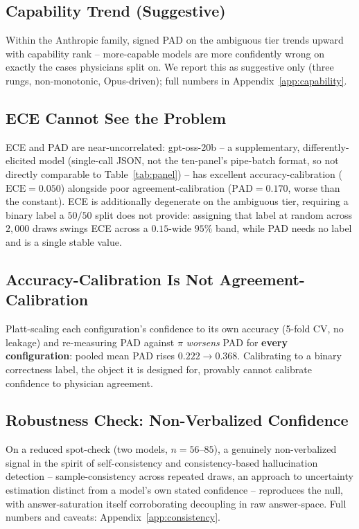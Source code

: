 \documentclass[letterpaper]{article} %
\begin{document}
\subsection{Capability Trend (Suggestive)}
\label{sec:capability}
Within the Anthropic family, signed PAD on the ambiguous tier trends upward
with capability rank -- more-capable models are more confidently wrong on
exactly the cases physicians split on. We report this as suggestive only
(three rungs, non-monotonic, Opus-driven); full numbers in
Appendix~\ref{app:capability}.

\subsection{ECE Cannot See the Problem}
ECE and PAD are near-uncorrelated: gpt-oss-20b -- a supplementary,
differently-elicited model (single-call JSON, not the ten-panel's
pipe-batch format, so not directly comparable to Table~\ref{tab:panel}) --
has excellent accuracy-calibration ($\mathrm{ECE}{=}0.050$) alongside poor
agreement-calibration ($\mathrm{PAD}{=}0.170$, worse than the constant). ECE
is additionally degenerate on the ambiguous tier, requiring a binary label a
$50/50$ split does not provide: assigning that label at random across
$2{,}000$ draws swings ECE across a $0.15$-wide $95\%$ band, while PAD needs
no label and is a single stable value.

\subsection{Accuracy-Calibration Is Not Agreement-Calibration}
\label{sec:acc-cal}
Platt-scaling each configuration's confidence to its own accuracy (5-fold
CV, no leakage) and re-measuring PAD against $\pi$ \emph{worsens} PAD for
\textbf{every configuration}: pooled mean PAD rises $0.222\to0.368$.
Calibrating to a binary correctness label, the object it is designed for,
provably cannot calibrate confidence to physician agreement.

\subsection{Robustness Check: Non-Verbalized Confidence}
\label{sec:consistency}
On a reduced spot-check (two models, $n{=}56$--$85$), a genuinely
non-verbalized signal in the spirit of self-consistency and
consistency-based hallucination detection
\citep{wang2023selfconsistency,manakul2023selfcheckgpt} -- sample-consistency
across repeated draws, an approach to uncertainty estimation distinct from a
model's own stated confidence \citep{malinin2021uncertainty} -- reproduces
the null, with answer-saturation itself corroborating decoupling in raw
answer-space. Full numbers and caveats: Appendix~\ref{app:consistency}.
\end{document}

